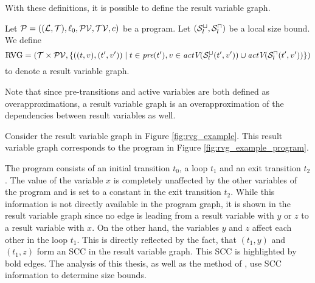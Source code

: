 With these definitions, it is possible to define the result variable graph.

\begin{definition}
  Let $\mathcal{P} = ((\mathcal{L}, \mathcal{T}), \ell_0, \mathcal{PV}, \mathcal{TV}, c)$ be a program.
  Let ${({\mathcal{S}^\sqcup_l}, {\mathcal{S}^\sqcap_l})}$ be a local size bound.
  We define 
  \[ \text{RVG} = (\mathcal{T} \times \mathcal{PV}, \lbrace ((t, v), (t', v')) \mid t \in \emph{pre}(t'), v \in \emph{actV}({\mathcal{S}^\sqcup_l}(t',v')) \cup \emph{actV}({\mathcal{S}^\sqcap_l}(t',v')) \rbrace) \]
  to denote a result variable graph.
\end{definition}

Note that since pre-transitions and active variables are both defined as overapproximations, a result variable graph is an overapproximation of the dependencies between result variables as well.

\begin{example}
  Consider the result variable graph in Figure \ref{fig:rvg_example}.
  This result variable graph corresponds to the program in Figure \ref{fig:rvg_example_program}.
  
  The program consists of an initial transition $t_0$, a loop $t_1$ and an exit transition $t_2$.
  The value of the variable $x$ is completely unaffected by the other variables of the program and is set to a constant in the exit transition $t_2$.
  While this information is not directly available in the program graph, it is shown in the result variable graph since no edge is leading from a result variable with $y$ or $z$ to a result variable with $x$.
  On the other hand, the variables $y$ and $z$ affect each other in the loop $t_1$.
  This is directly reflected by the fact, that $(t_1,y)$ and $(t_1,z)$ form an SCC in the result variable graph.
  This SCC is highlighted by bold edges.
  The analysis of this thesis, as well as the method of \cite{koat}, use SCC information to determine size bounds.
\end{example}
